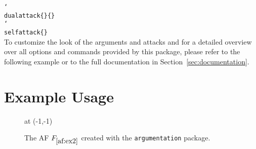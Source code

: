 \documentclass{scrartcl}
\newcommand{\argumentation}{\texttt{argumentation}\xspace}
\newcommand{\mopt}[2][red]{\textcolor{#1}{\ttfamily \meta{#2}}}
\DeclareRobustCommand\cs[2][-1.6cm]{\hspace{#1}\texttt{\char`\\#2}}
\begin{document}
\noindent\cs[0cm]{dualattack\{\mopt{a1}\}\{\mopt{a2}\}}\\
\noindent\cs[0cm]{selfattack\{\mopt{a1}\}}\\


To customize the look of the arguments and attacks and for a detailed overview over all options and commands provided by this package, please refer to the following example or to the full documentation in Section~\ref{sec:documentation}.


\newpage
\section{Example Usage}\label{sec:example}
\vspace{-0.5cm}
\begin{figure}[ht]
    \centering
    \begin{af}[namestyle=math]


         at (-1,-1)

        

        \label{af:ex2}
    \end{af}
    \caption{The AF $F_{\ref{af:ex2}}$ created with the \argumentation package.}
    \label{fig:example}
\end{figure}
\end{document}
